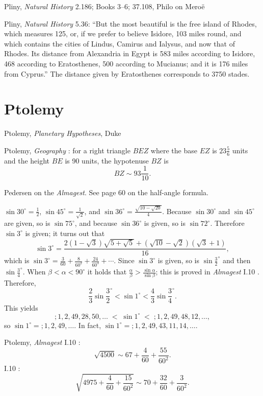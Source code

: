 \documentclass{amsart}
\theoremstyle{definition}
\begin{document}
Pliny, {\em Natural History} 2.186; Books 3--6; 37.108, Philo on Mero\"e

Pliny, {\em Natural History} 5.36: ``But the most beautiful is the free island of Rhodes, which measures 125, or, if we prefer to believe
Isidore, 103 miles round, and which contains the cities of Lindus, Camirus and Ialysus, and now that
of Rhodes. Its distance from Alexandria in Egypt
is 583 miles according to Isidore, 468 according to Eratosthenes, 500 according to Mucianus; and it is 176 miles from Cyprus.''
The distance given by Eratosthenes corresponds to 3750 stades.




\section{Ptolemy}
Ptolemy, {\em Planetary Hypotheses}, Duke \cite{duke}

Ptolemy, {\em Geography} \cite[p.~90]{geography}: for a right triangle $BEZ$ where the base $EZ$ is $23 \frac{5}{6}$ units and the height
$BE$ is 90 units, the hypotenuse $BZ$ is
\[
BZ \sim 93 \frac{1}{10}.
\]

Pedersen \cite{pedersen} on the {\em Almagest}. See page 60 on the half-angle formula.

$\sin 30^\circ = \frac{1}{2}$, $\sin 45^\circ = \frac{1}{\sqrt{2}}$, and $\sin 36^\circ = \frac{\sqrt{10-\sqrt{20}}}{4}$.
Because
$\sin 30^\circ$ and $\sin 45^\circ$ are given, so is $\sin 75^\circ$, and because
$\sin 36^\circ$ is given, so is $\sin 72^\circ$. Therefore
$\sin 3^\circ$ is given; it turns out that
\[
\sin 3^\circ = \frac{2(1-\sqrt{3})\sqrt{5+\sqrt{5}}+(\sqrt{10}-\sqrt{2})(\sqrt{3}+1)}{16},
\] 
which is $\sin 3^\circ = \frac{3}{60}+\frac{8}{60^2}+\frac{24}{60^3}+\cdots$.
Since $\sin 3^\circ$ is given, so is $\sin \frac{3}{2}^\circ$ and then
$\sin \frac{3}{4}^\circ$.  When $\beta<\alpha<90^\circ$ it holds that
$\frac{\alpha}{\beta}>\frac{\sin \alpha}{\sin \beta}$;
this is proved in {\em Almagest} I.10 \cite[pp.~54--55]{almagest}.
Therefore,
\[
\frac{2}{3} \sin \frac{3}{2}^\circ < \sin 1^\circ < \frac{4}{3}\sin \frac{3}{4}^\circ.
\]
This yields
\[
;1,2,49,28,50,\ldots \; < \; \sin 1^\circ  \; < \; ;1,2,49,48,12,\ldots,
\]
so $\sin 1^\circ = ;1,2,49,\ldots$. In fact, $\sin 1^\circ = ;1,2,49,43,11,14,\ldots$. 

Ptolemy, {\em Almagest} I.10 \cite[p.~49]{almagest}:
\[
\sqrt{4500} \sim 67+\frac{4}{60}+\frac{55}{60^2}.
\]
I.10 \cite[p.~49]{almagest}:
\[
\sqrt{4975+\frac{4}{60}+\frac{15}{60^2}} \sim 70+\frac{32}{60}+\frac{3}{60^2}.
\]
\end{document}
